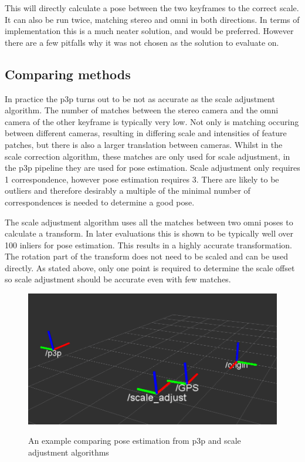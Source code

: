 This will directly calculate a pose between the two keyframes to the correct scale.  It can also be run twice, matching stereo and omni in both directions. In terms of implementation this is a much neater solution, and would be preferred.  However there are a few pitfalls why it was not chosen as the solution to evaluate on.

\subsection{Comparing methods}

In practice the p3p turns out to be not as accurate as the scale adjustment algorithm.  The number of matches between the stereo camera and the omni camera of the other keyframe is typically very low.  Not only is matching occuring between different cameras, resulting in differing scale and intensities of feature patches, but there is also a larger translation between cameras. Whilst in the scale correction algorithm, these matches are only used for scale adjustment, in the p3p pipeline they are used for pose estimation.  Scale adjustment only requires 1 correspondence, however pose estimation requires 3.  There are likely to be outliers and therefore desirably a multiple of the minimal number of correspondences is needed to determine a good pose.

The scale adjustment algorithm uses all the matches between two omni poses to calculate a transform.  In later evaluations this is shown to be typically well over 100 inliers for pose estimation.  This results in a highly accurate transformation.  The rotation part of the transform does not need to be scaled and can be used directly.  As stated above, only one point is required to determine the scale offset so scale adjustment should be accurate even with few matches.

\begin{figure}[H]
  \centering
    \includegraphics[width=1.0\textwidth]{chapters/images/scale_vs_p3p_1}\\
  \caption{An example comparing pose estimation from p3p and scale adjustment algorithms}
  \label{fig:p3p_flowchart}
\end{figure}

